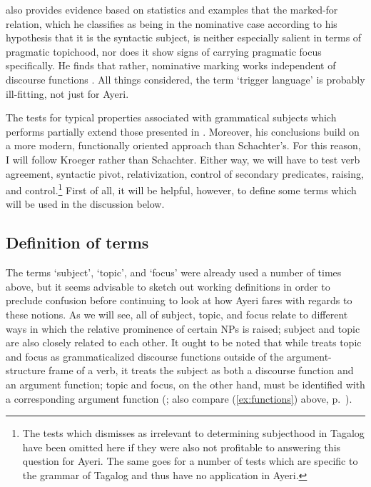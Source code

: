 \citet{kroeger1991} also provides evidence based on statistics and examples
that the marked-for relation, which he classifies as being in the nominative
case according to his hypothesis that it is the syntactic subject, is neither
especially salient in terms of pragmatic topichood, nor does it show signs of
carrying pragmatic focus specifically. He finds that rather, nominative marking
works independent of discourse functions \citep[56\psqq]{kroeger1991}.  All
things considered, the term `trigger language' is probably ill-fitting, not
just for Ayeri.

The tests for typical properties associated with grammatical subjects which
\citet{kroeger1991} performs partially extend those presented in
\citet{schachter1976}. Moreover, his conclusions build on a more modern,
functionally oriented approach than Schachter's. For this reason, I will follow
Kroeger rather than Schachter. Either way, we will have to test verb agreement,
syntactic pivot, relativization, control of secondary predicates, raising, and
control.\footnote{The tests which \citet{kroeger1991} dismisses as irrelevant
to determining subjecthood in Tagalog have been omitted here if they were also
not profitable to answering this question for Ayeri. The same goes for a number
of tests which are specific to the grammar of Tagalog and thus have no
application in Ayeri.} First of all, it will be helpful, however, to define
some terms which will be used in the discussion below.

\subsection{Definition of terms}

The terms `subject', `topic', and `focus' were already used a number of times
above, but it seems advisable to sketch out working definitions in order to
preclude confusion before continuing to look at how Ayeri fares with regards to
these notions. As we will see, all of subject, topic, and focus relate to
different ways in which the relative prominence of certain NPs is raised;
subject and topic are also closely related to each other. It ought to be noted
that while \Lfg{} treats topic and focus as grammaticalized discourse functions
outside of the argument-structure frame of a verb, it treats the subject as
both a discourse function and an argument function; topic and focus, on the
other hand, must be identified with a corresponding argument function
(\cite[99--100]{bresnan2016}; also compare (\ref{ex:functions}) above,
p.~\pageref{ex:functions}).

